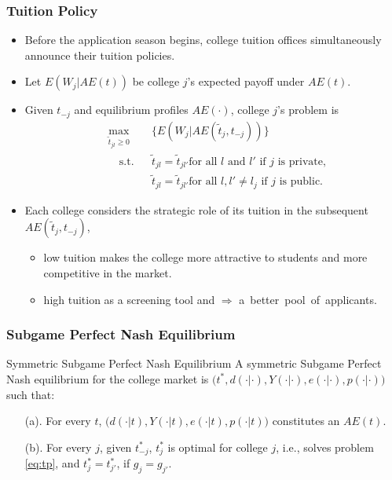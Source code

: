 \documentclass[10pt]{beamer}
\begin{document}
\begin{frame}[c]\frametitle{Tuition Policy}
\begin{itemize}
    \item Before the application season begins, college tuition offices simultaneously announce their tuition policies.
    \item Let $E(W_{j}|AE(t))$ be college $j$'s expected payoff under $AE(t)$.
    \item Given $t_{-j}$ and equilibrium profiles $AE(\cdot)$, college $j$'s problem is
    \begin{equation}\label{eq:tp}
    \begin{aligned}
    & \max _{\tilde{t}_{jl}\geq 0} & & \big\{E(W_{j}|AE(\tilde{t}_{j},t_{-j}))\big\} \\
    & \quad \text{s.t.}  & & \tilde{t}_{jl} = \tilde{t}_{jl'} \text{for all $l$ and $l'$ if $j$ is private},\\
    & \quad \text{}  & & \tilde{t}_{jl} = \tilde{t}_{jl'} \text{for all $l,l'\not = l_{j}$ if $j$ is public}.
    \end{aligned}
    \end{equation}
    \item Each college considers the strategic role of its tuition
in the subsequent $AE(\tilde{t}_{j},t_{-j})$,
    \begin{itemize}
        \item  low tuition makes the college more attractive to students and more competitive in the market.
        \item  high tuition as a screening tool and $\Rightarrow$ \mbox{a better pool of applicants.}
    \end{itemize}
\end{itemize}
\end{frame}


\begin{frame}[c]\frametitle{Subgame Perfect Nash Equilibrium}

\begin{alertblock}{Symmetric Subgame Perfect Nash Equilibrium}
A symmetric Subgame Perfect Nash equilibrium for the college market is
$\big(t^{*},d(\cdot|\cdot),Y(\cdot|\cdot),e(\cdot|\cdot),p(\cdot|\cdot)\big)$ such that:
\begin{enumerate}
    \item[(a).] For every $t$, $\big(d(\cdot|t),Y(\cdot|t),e(\cdot|t),p(\cdot|t)\big)$ constitutes an $AE(t)$.
    \item[(b).] For every $j$, given $t^{*}_{-j}$, $t_{j}^{*}$ is optimal for college $j$, i.e., solves problem \eqref{eq:tp}, and $t_{j}^{*} = t^{*}_{j'}$, if $g_{j}=g_{j'}$.
\end{enumerate}

\end{alertblock}

\end{frame}
\end{document}
